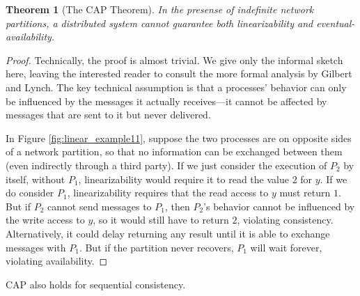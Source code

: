 \documentclass[]             %
{NASA}                       %
\newtheorem{theorem}{Theorem}[section]
\theoremstyle{definition}
\begin{document}
\begin{theorem}[The CAP Theorem]
  \label{thm:cap}
  In the presense of indefinite network partitions, a distributed system
  cannot guarantee both linearizability and eventual-availability.
\end{theorem}
\begin{proof}
  Technically, the proof is almost trivial. We give only the informal
  sketch here, leaving the interested reader to consult the more formal
  analysis by Gilbert and Lynch. The key technical assumption is that a
  processes' behavior can only be influenced by the messages it actually
  receives---it cannot be affected by messages that are sent to it but
  never delivered.

  In Figure \ref{fig:linear_example11}, suppose the two processes are on
  opposite sides of a network partition, so that no information can be
  exchanged between them (even indirectly through a third party). If we
  just consider the execution of $P_2$ by itself, without $P_1$,
  linearizability would require it to read the value $2$ for $y$. If we
  do consider $P_1$, linearizability requires that the read access to
  $y$ must return $1$. But if $P_2$ cannot send messages to $P_1$, then
  $P_2$'s behavior cannot be influenced by the write access to $y$, so
  it would still have to return $2$, violating
  consistency. Alternatively, it could delay returning any result until
  it is able to exchange messages with $P_1$. But if the partition never
  recovers, $P_1$ will wait forever, violating availability.
\end{proof}

CAP also holds for sequential consistency.
\end{document}
